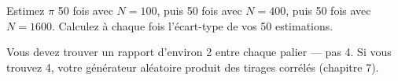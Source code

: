 \begin{nkexo}
Estimez $\pi$ 50 fois avec $N = 100$, puis 50 fois avec $N = 400$, puis 50 fois
avec $N = 1600$. Calculez à chaque fois l'écart-type de vos 50 estimations.

Vous devez trouver un rapport d'environ 2 entre chaque palier — pas 4. Si vous
trouvez 4, votre générateur aléatoire produit des tirages corrélés (chapitre 7).
\end{nkexo}
